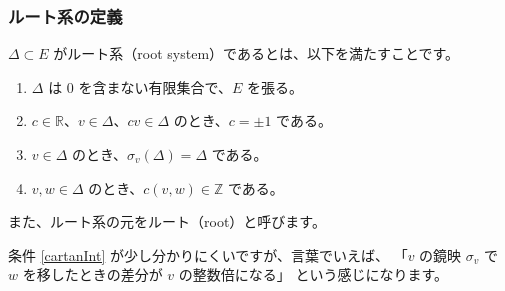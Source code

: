 \documentclass{beamer}
\begin{document}
\begin{frame}
    \frametitle{ルート系の定義}

    \begin{definition}[ルート系]
        $\Delta \subset E$ がルート系（root system）であるとは、以下を満たすことです。

        \begin{enumerate}
            \item $\Delta$ は $0$ を含まない有限集合で、$E$ を張る。
            \item $c \in \mathbb{R}$、$v \in \Delta$、$cv \in \Delta$
                  のとき、$c = \pm 1$ である。
            \item $v \in \Delta$ のとき、$\sigma_v(\Delta) = \Delta$ である。
            \item \label{cartanInt} $v, w \in \Delta$ のとき、$c(v,w) \in \mathbb{Z}$ である。
        \end{enumerate}

        また、ルート系の元をルート（root）と呼びます。
    \end{definition}

    条件 \ref{cartanInt} が少し分かりにくいですが、言葉でいえば、
    「$v$ の鏡映 $\sigma_v$ で $w$ を移したときの差分が $v$ の整数倍になる」
    という感じになります。
\end{frame}
\end{document}
